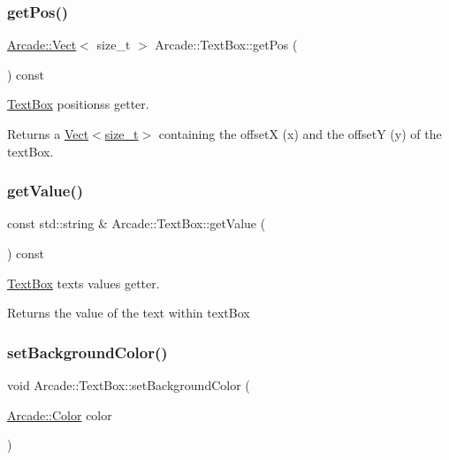 \subsubsection{\texorpdfstring{get\+Pos()}{getPos()}}
{\footnotesize\ttfamily \hyperlink{class_arcade_1_1_vect}{Arcade\+::\+Vect}$<$ size\+\_\+t $>$ Arcade\+::\+Text\+Box\+::get\+Pos (\begin{DoxyParamCaption}{ }\end{DoxyParamCaption}) const}



\hyperlink{class_arcade_1_1_text_box}{Text\+Box} positions\textquotesingle{}s getter. 

\begin{DoxyReturn}{Returns}
a \hyperlink{class_arcade_1_1_vect}{Vect$<$size\+\_\+t$>$} containing the offsetX (x) and the offsetY (y) of the text\+Box. 
\end{DoxyReturn}
\mbox{\label{class_arcade_1_1_text_box_a08d2b7ad04db74670557a2136db06add}} 
\subsubsection{\texorpdfstring{get\+Value()}{getValue()}}
{\footnotesize\ttfamily const std\+::string \& Arcade\+::\+Text\+Box\+::get\+Value (\begin{DoxyParamCaption}{ }\end{DoxyParamCaption}) const}



\hyperlink{class_arcade_1_1_text_box}{Text\+Box} text\textquotesingle{}s value\textquotesingle{}s getter. 

\begin{DoxyReturn}{Returns}
the value of the text within text\+Box 
\end{DoxyReturn}
\mbox{\label{class_arcade_1_1_text_box_a01f432d437ec9500bb8fc6383765f90b}} 
\subsubsection{\texorpdfstring{set\+Background\+Color()}{setBackgroundColor()}}
{\footnotesize\ttfamily void Arcade\+::\+Text\+Box\+::set\+Background\+Color (\begin{DoxyParamCaption}\item[{\hyperlink{class_arcade_1_1_color}{Arcade\+::\+Color}}]{color }\end{DoxyParamCaption})}



